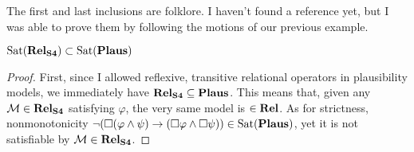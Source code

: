 \documentclass[letterpaper]{article}
\begin{document}
The first and last inclusions are folklore.  I haven't found a reference yet, but I was able to prove them by following the motions of our previous example.

\begin{proposition}
    $\mathrm{Sat}( \textrm{\textbf{Rel}}_\textrm{\textbf{S4}} ) \subset \mathrm{Sat}( \textrm{\textbf{Plaus}} )$
\end{proposition}
\begin{proof}
    First, since I allowed reflexive, transitive relational operators in plausibility models, we immediately have $\textrm{\textbf{Rel}}_\textrm{\textbf{S4}} \subseteq \textrm{\textbf{Plaus}}$.  This means that, given any $\mathcal{M} \in \textrm{\textbf{Rel}}_\textrm{\textbf{S4}}$ satisfying $\varphi$, the very same model is $\in \textrm{\textbf{Rel}}$.  As for strictness, nonmonotonicity $\neg (\Box(\varphi \land \psi) \to (\Box \varphi \land \Box \psi)) \in \mathrm{Sat}( \textrm{\textbf{Plaus}} )$, yet it is not satisfiable by $\mathcal{M} \in \textrm{\textbf{Rel}}_\textrm{\textbf{S4}}$.
\end{proof}

    
    
    
\end{document}
